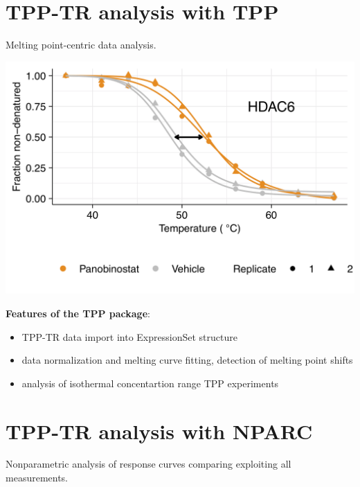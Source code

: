\documentclass{article}
\newcommand{\hcode}[2][lgray]{{\ttfamily\color{vdgray}\colorbox{#1}{#2}}}
\begin{document}
\begin{multicols}{2}
\begin{minipage}[t]{\linewidth}
  \section*{\huge TPP-TR analysis with \hcode{TPP} \cite{franken_2015}}
  Melting point-centric data analysis.

  \begin{minipage}{0.6\linewidth}
  \includegraphics[width=\linewidth]{figs/tpp-tr_example.png}
  \end{minipage}%
  \begin{minipage}{0.4\linewidth}

  \textbf{Features of the \hcode{TPP} package}:

  \begin{itemize}

  \item TPP-TR data import into ExpressionSet structure
  \item data normalization and melting curve fitting, detection of melting point shifts
  \item analysis of isothermal concentartion range TPP experiments
  
  \end{itemize}
  \end{minipage}

  \section*{\huge TPP-TR analysis with \hcode{NPARC} \cite{childs_2019}}
  Nonparametric analysis of response curves comparing exploiting all measurements.  


\end{minipage}
\end{multicols}
\end{document}
